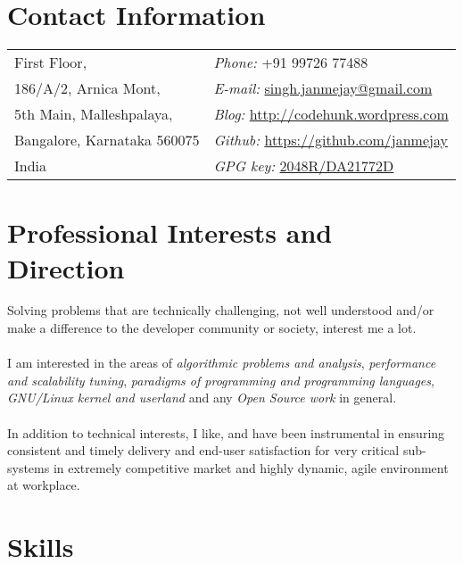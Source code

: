 \documentclass[margin,line]{res}
\begin{document}

\begin{resume}
  \section{\sc Contact Information}
  \vspace{.05in}
  \begin{tabular}{@{}p{2in}p{4in}}
    First Floor,                & {\it Phone:}  +91 99726 77488 \\            
    186/A/2, Arnica Mont,       & {\it E-mail:}  \href{mailto:singh.janmejay@gmail.com}{singh.janmejay@gmail.com}\\       
    5th Main, Malleshpalaya,    & {\it Blog:}    \url{http://codehunk.wordpress.com} \\         
    Bangalore, Karnataka 560075 & {\it Github:} \url{https://github.com/janmejay} \\     
    India                       & {\it GPG key:} \href{http://pgp.mit.edu:11371/pks/lookup?op=vindex&search=0x3A9F2343DA21772D}{2048R/DA21772D}\\
  \end{tabular}


\section{\sc Professional Interests and Direction}
Solving problems that are technically challenging, not well understood and/or make a difference to the developer community or society, interest me a lot.\\
\\
I am interested in the areas of {\it algorithmic problems and analysis}, {\it performance and scalability tuning}, {\it paradigms of programming and programming languages}, {\it GNU/Linux kernel and userland} and any {\it Open Source work} in general.\\
\\
In addition to technical interests, I like, and have been instrumental in ensuring consistent and timely delivery and end-user satisfaction for very critical sub-systems in extremely competitive market and highly dynamic, agile environment at workplace.

\section{\sc Skills}


\end{resume}
\end{document}
